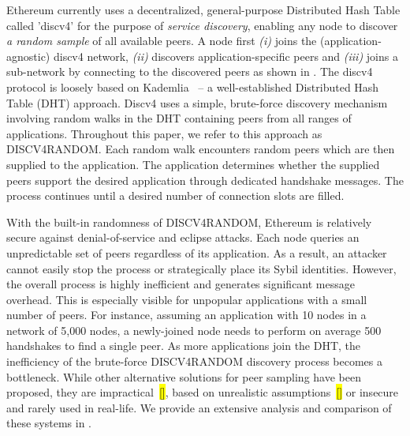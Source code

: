  Ethereum currently uses a decentralized, general-purpose Distributed Hash Table called 'discv4' for the purpose of \textit{service discovery},  enabling any node to discover \textit{a random sample} of all available peers. A node first \textit{(i)} joins the (application-agnostic) discv4 network, \textit{(ii)} discovers application-specific peers and \textit{(iii)} joins a sub-network by connecting to the discovered peers as shown in . The discv4 protocol is loosely based  on Kademlia~\cite{maymounkov2002kademlia} – a well-established Distributed Hash Table (DHT) approach. Discv4 uses a simple, brute-force discovery mechanism involving random walks in the DHT containing peers from all ranges of applications. Throughout this paper, we refer to this approach as DISCV4RANDOM. Each random walk encounters random peers which are then supplied to the application. The application determines whether the supplied peers support the desired application through dedicated handshake messages. The process continues until a desired number of connection slots are filled. 

With the built-in randomness of DISCV4RANDOM, Ethereum is relatively secure against denial-of-service and eclipse attacks. Each node queries an unpredictable set of peers regardless of its application. As a result, an attacker cannot easily stop the process or strategically place its Sybil identities.
However, the overall process is highly inefficient and generates significant message overhead. This is especially visible for unpopular applications with a small number of peers.  For instance, assuming an application with 10 nodes in a network of 5,000 nodes, a newly-joined node needs to perform on average 500 handshakes to find a single peer.  As more applications join the DHT, the inefficiency of the brute-force DISCV4RANDOM discovery process becomes a bottleneck. While other alternative solutions for peer sampling have been proposed, they are impractical~\hl{[]}, based on unrealistic assumptions~\hl{[]} or insecure and rarely used in real-life. We provide an extensive analysis and comparison of these systems in .



